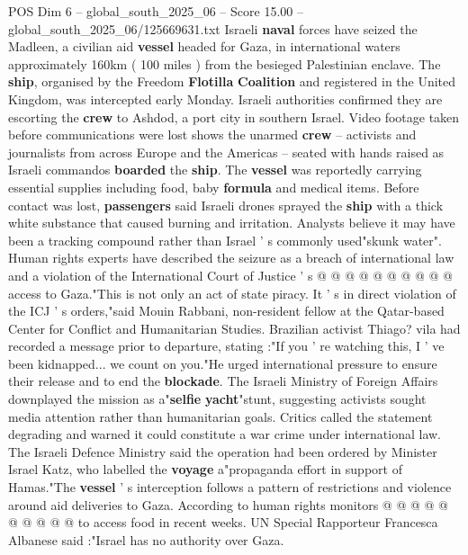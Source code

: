 \begin{textsample}{POS Dim 6 – global\_south\_2025\_06 – Score 15.00 – global\_south\_2025\_06/125669631.txt}  \label{ex:f6_pos_010}
Israeli \textbf{naval} forces have seized the Madleen, a civilian aid \textbf{vessel} headed for Gaza, in international waters approximately 160km ( 100 miles ) from the besieged Palestinian enclave.
The \textbf{ship}, organised by the Freedom \textbf{Flotilla} \textbf{Coalition} and registered in the United Kingdom, was intercepted early Monday.
Israeli authorities confirmed they are escorting the \textbf{crew} to Ashdod, a port city in southern Israel.
Video footage taken before communications were lost shows the unarmed \textbf{crew} -- activists and journalists from across Europe and the Americas -- seated with hands raised as Israeli commandos \textbf{boarded} the \textbf{ship}.
The \textbf{vessel} was reportedly carrying essential supplies including food, baby \textbf{formula} and medical items.
Before contact was lost, \textbf{passengers} said Israeli drones sprayed the \textbf{ship} with a thick white substance that caused burning and irritation.
Analysts believe it may have been a tracking compound rather than Israel ' s commonly used"skunk water".
Human rights experts have described the seizure as a breach of international law and a violation of the International Court of Justice ' s @ @ @ @ @ @ @ @ @ @ access to Gaza."This is not only an act of state piracy.
It ' s in direct violation of the ICJ ' s orders,"said Mouin Rabbani, non-resident fellow at the Qatar-based Center for Conflict and Humanitarian Studies.
Brazilian activist Thiago? vila had recorded a message prior to departure, stating :"If you ' re watching this, I ' ve been kidnapped... we count on you."He urged international pressure to ensure their release and to end the \textbf{blockade}.
The Israeli Ministry of Foreign Affairs downplayed the mission as a"\textbf{selfie} \textbf{yacht}"stunt, suggesting activists sought media attention rather than humanitarian goals.
Critics called the statement degrading and warned it could constitute a war crime under international law.
The Israeli Defence Ministry said the operation had been ordered by Minister Israel Katz, who labelled the \textbf{voyage} a"propaganda effort in support of Hamas."The \textbf{vessel} ' s interception follows a pattern of restrictions and violence around aid deliveries to Gaza.
According to human rights monitors @ @ @ @ @ @ @ @ @ @ to access food in recent weeks.
UN Special Rapporteur Francesca Albanese said :"Israel has no authority over Gaza.

\end{textsample}
